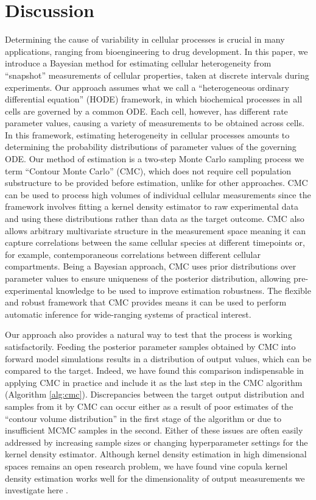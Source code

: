 \section{Discussion}
\label{sec:discussion}
Determining the cause of variability in cellular processes is crucial in many applications, ranging from bioengineering to drug development. In this paper, we introduce a Bayesian method for estimating cellular heterogeneity from ``snapshot'' measurements of cellular properties, taken at discrete intervals during experiments. Our approach assumes what we call a ``heterogeneous ordinary differential equation'' (HODE) framework, in which biochemical processes in all cells are governed by a common ODE. Each cell, however, has different rate parameter values, causing a variety of measurements to be obtained across cells. In this framework, estimating heterogeneity in cellular processes amounts to determining the probability distributions of parameter values of the governing ODE. Our method of estimation is a two-step Monte Carlo sampling process we term ``Contour Monte Carlo'' (CMC), which does not require cell population substructure to be provided before estimation, unlike for other approaches. CMC can be used to process high volumes of individual cellular measurements since the framework involves fitting a kernel density estimator to raw experimental data and using these distributions rather than data as the target outcome. CMC also allows arbitrary multivariate structure in the measurement space meaning it can capture correlations between the same cellular species at different timepoints or, for example, contemporaneous correlations between different cellular compartments. Being a Bayesian approach, CMC uses prior distributions over parameter values to ensure uniqueness of the posterior distribution, allowing pre-experimental knowledge to be used to improve estimation robustness. The flexible and robust framework that CMC provides means it can be used to perform automatic inference for wide-ranging systems of practical interest.

Our approach also provides a natural way to test that the process is working satisfactorily. Feeding the posterior parameter samples obtained by CMC into forward model simulations results in a distribution of output values, which can be compared to the target. Indeed, we have found this comparison indispensable in applying CMC in practice and include it as the last step in the CMC algorithm (Algorithm \ref{alg:cmc}). Discrepancies between the target output distribution and samples from it by CMC can occur either as a result of poor estimates of the ``contour volume distribution'' in the first stage of the algorithm or due to insufficient MCMC samples in the second. Either of these issues are often easily addressed by increasing sample sizes or changing hyperparameter settings for the kernel density estimator. Although kernel density estimation in high dimensional spaces remains an open research problem, we have found vine copula kernel density estimation works well for the dimensionality of output measurements we investigate here \cite{nagler2016evading}.

